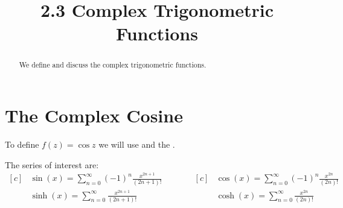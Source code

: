 \documentclass[handout]{ximera}
\title{2.3 Complex Trigonometric Functions}
\begin{document}
\begin{abstract}
We define and discuss the complex trigonometric functions.
\end{abstract}

\maketitle

\section{The Complex Cosine}

To define $f(z) = \cos z$ we will use 
and the 
.



The series of interest are:
\begin{equation*}
\begin{aligned}[c]
&\sin(x) =\sum_{n=0}^\infty (-1)^n \frac{x^{2n+1}}{(2n+1)!}\\[15pt]
&\sinh(x)=\sum_{n=0}^\infty \frac{x^{2n+1}}{(2n+1)!}\\
\end{aligned}
\quad \quad\quad
\begin{aligned}[c]
&\cos(x) =\sum_{n=0}^\infty (-1)^n \frac{x^{2n}}{(2n)!}\\[15pt]
&\cosh(x)=\sum_{n=0}^\infty \frac{x^{2n}}{(2n)!}\\
\end{aligned}
\end{equation*}


\end{document}
